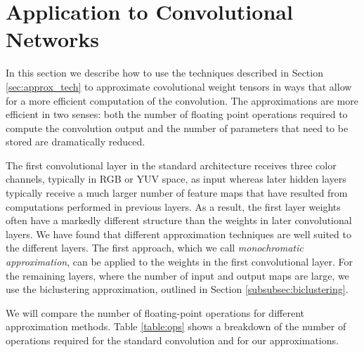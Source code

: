 \section{Application to Convolutional Networks}\label{sec:application}
In this section we describe how to use the techniques described in
Section \ref{sec:approx_tech} to approximate covolutional weight
tensors in ways that allow for a more efficient computation of the
convolution. The approximations are more efficient in two senses:
both the number of floating point operations required to compute the
convolution output and the number of parameters that need to be stored
are dramatically reduced.

The first convolutional layer in the standard architecture receives
three color channels, typically in RGB or YUV space, as input whereas
later hidden layers typically receive a much larger number of feature
maps that have resulted from computations performed in previous
layers. As a result, the first layer weights often have a markedly
different structure than the weights in later convolutional layers. We
have found that different approximation techniques are well suited to
the different layers. The first approach, which we call {\em monochromatic
approximation}, can be applied to the weights in the first
convolutional layer. For the remaining layers, where the number of
input and output maps are large, we use the 
biclustering approximation, outlined in Section
\ref{subsubsec:biclustering}.

We will compare the number of floating-point operations for different
approximation methods. Table \ref{table:ops} shows a breakdown of the number of operations required for the standard convolution and for our approximations.

